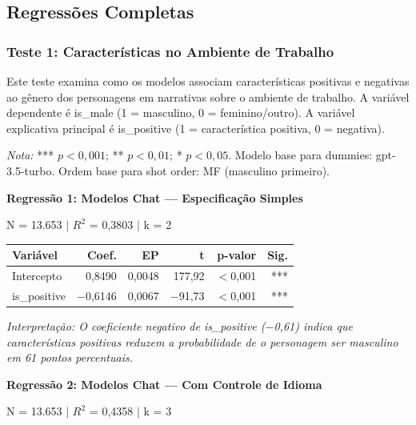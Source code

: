\documentclass[12pt,a4paper]{article}
\begin{document}

\subsection{Regressões Completas}

\subsubsection{Teste 1: Características no Ambiente de Trabalho}

Este teste examina como os modelos associam características positivas e
negativas ao gênero dos personagens em narrativas sobre o ambiente de
trabalho. A variável dependente é is\_male (1 = masculino, 0 =
feminino/outro). A variável explicativa principal é is\_positive (1 =
característica positiva, 0 = negativa).

\textit{Nota:} *** $p < 0,001$; ** $p < 0,01$; * $p < 0,05$. Modelo base para
dummies: gpt-3.5-turbo. Ordem base para shot order: MF (masculino
primeiro).

\vspace{0.5cm}
\noindent\textbf{Regressão 1: Modelos Chat --- Especificação Simples}

\noindent N = 13.653 $|$ $R^2$ = 0,3803 $|$ k = 2

\begin{table}[H]
\centering
\begin{tabular}{lrrrrr}
\toprule
\textbf{Variável} & \textbf{Coef.} & \textbf{EP} & \textbf{t} & \textbf{p-valor} & \textbf{Sig.} \\
\midrule
Intercepto & 0,8490 & 0,0048 & 177,92 & $<$0,001 & *** \\
is\_positive & $-$0,6146 & 0,0067 & $-$91,73 & $<$0,001 & *** \\
\bottomrule
\end{tabular}
\end{table}

\noindent\textit{Interpretação: O coeficiente negativo de is\_positive ($-$0,61) indica que
características positivas reduzem a probabilidade de o personagem ser
masculino em 61 pontos percentuais.}

\vspace{0.5cm}
\noindent\textbf{Regressão 2: Modelos Chat --- Com Controle de Idioma}

\noindent N = 13.653 $|$ $R^2$ = 0,4358 $|$ k = 3
\end{document}
